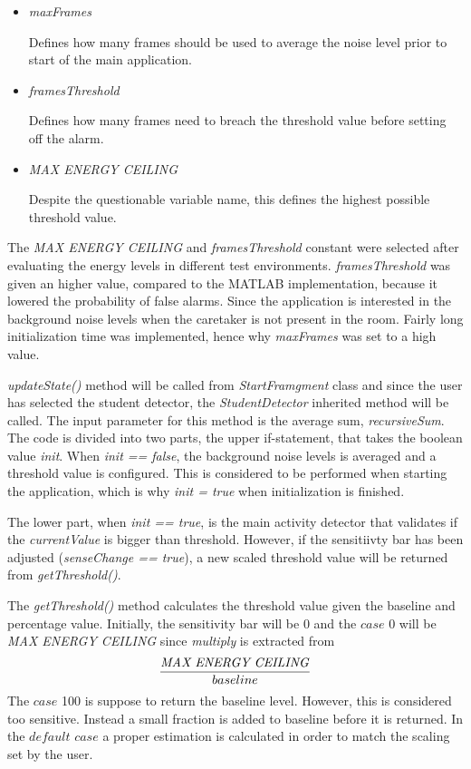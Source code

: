 \begin{itemize}
\item \emph{maxFrames}
	
	Defines how many frames should be used to average the noise level 
	prior to start of the main application.
\item \emph{framesThreshold}
	
	Defines how many frames need to breach the threshold value before
	setting off the alarm.
\item \emph{MAX ENERGY CEILING} 
	
	Despite the questionable variable name, this defines the highest 
	possible threshold value.
\end{itemize}
The \emph{MAX ENERGY CEILING} and \emph{framesThreshold} constant were selected 
after evaluating the energy levels in different test environments. 
\emph{framesThreshold} was given an higher value, compared to the MATLAB
implementation, because it lowered the probability of false alarms.
Since the application is interested in the background noise levels when the
caretaker is not present in the room.  Fairly long initialization time was
implemented, hence why \emph{maxFrames} was set to a high value. 



\emph{updateState()} method will be called from \emph{StartFramgment} class and
since the user has selected the student detector, the \emph{StudentDetector} 
inherited method will be called. The input parameter for this method is the 
average sum, \emph{recursiveSum}. The code is divided into two parts, the upper
if-statement, that takes the boolean value \emph{init}. 
When \emph{init == false}, the background noise levels is averaged and a 
threshold value is configured. This is considered to be performed when starting 
the application, which is why \emph{init = true} when initialization is finished.

The lower part, when \emph{init == true}, is the main activity detector that
validates if the \emph{currentValue} is bigger than threshold. However, if the
sensitiivty bar has been adjusted (\emph{senseChange == true}), a new scaled 
threshold value will be returned from \emph{getThreshold()}.




The \emph{getThreshold()} method calculates the threshold value given the
baseline and percentage value. Initially, the sensitivity bar will be 0 and
the $case$ 0 will be \emph{MAX ENERGY CEILING} since \emph{multiply} is
extracted from
\[
\frac{\mbox{\emph{MAX ENERGY CEILING}}}{baseline} 
\]
The $case$ 100 is suppose to return the baseline level. However, this is 
considered too sensitive. Instead a small fraction is added to baseline 
before it is returned. In the $default$ $case$ a proper estimation is 
calculated in order to match the scaling set by the user.


